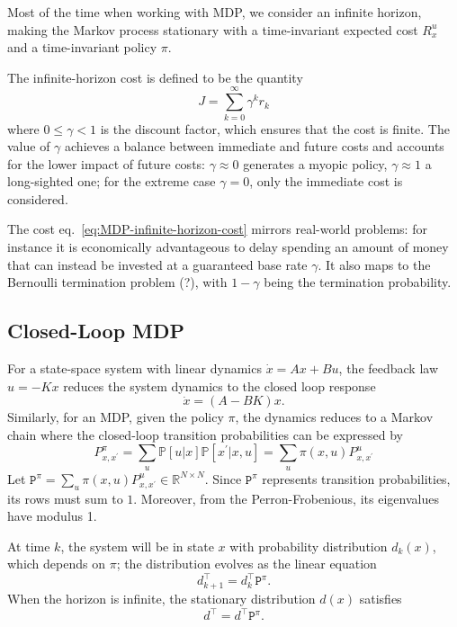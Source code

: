 Most of the time when working with MDP, we consider an infinite horizon, making the Markov process stationary with a time-invariant expected cost $R_x^u$ and a time-invariant policy $\pi$.

The infinite-horizon cost is defined to be the quantity
\begin{equation}
  \label{eq:MDP-infinite-horizon-cost}
  J = \sum_{k=0}^\infty \gamma^k r_k
\end{equation}
where $0 \le \gamma < 1$ is the discount factor, which ensures that the cost is finite. The value of $\gamma$ achieves a balance between immediate and future costs and accounts for the lower impact of future costs: $\gamma \approx 0$ generates a myopic policy, $\gamma \approx 1$ a long-sighted one; for the extreme case $\gamma = 0$, only the immediate cost is considered.

The cost eq.~\eqref{eq:MDP-infinite-horizon-cost} mirrors real-world problems: for instance it is economically advantageous to delay spending an amount of money that can instead be invested at a guaranteed base rate $\gamma$. It also maps to the Bernoulli termination problem (?), with $1-\gamma$ being the termination probability.

\subsection{Closed-Loop MDP}

For a state-space system with linear dynamics $\dot{x} = Ax+Bu$, the feedback law $u=-Kx$ reduces the system dynamics to the closed loop response
\begin{equation*}
  \dot{x} = (A-BK)x.
\end{equation*}
Similarly, for an MDP, given the policy $\pi$, the dynamics reduces to a Markov chain where the closed-loop transition probabilities can be expressed by
\begin{equation*}
  P^\pi _{x,x^\prime} = \sum_u \mathbb{P}[u|x] \mathbb{P}[x^\prime|x,u] = \sum_u \pi(x,u) P_{x,x^\prime}^u
\end{equation*}
Let $\mathtt{P}^\pi = \sum_u \pi(x,u) P_{x,x^\prime}^u\in \mathbb{R}^{N\times N}$. Since $\mathtt{P}^\pi$ represents transition probabilities, its rows must sum to $1$. Moreover, from the Perron-Frobenious, its eigenvalues have modulus 1.

At time $k$, the system will be in state $x$ with probability distribution $d_k(x)$, which depends on $\pi$; the distribution evolves as the linear equation
\begin{equation*}
  d_{k+1}^\top = d_k^\top \mathtt{P}^\pi.
\end{equation*}
When the horizon is infinite, the stationary distribution $d(x)$ satisfies
\begin{equation*}
  d^\top = d^\top \mathtt{P}^\pi.
\end{equation*}


